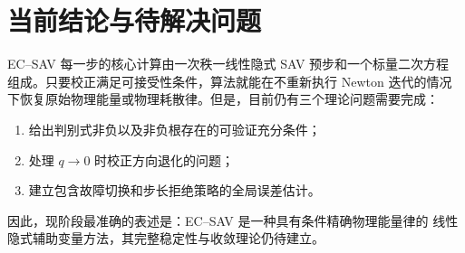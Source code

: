 \documentclass[UTF8,11pt,a4paper]{ctexart}
\theoremstyle{definition}
\theoremstyle{remark}
\begin{document}
\section{当前结论与待解决问题}

EC--SAV 每一步的核心计算由一次秩一线性隐式 SAV 预步和一个标量二次方程
组成。只要校正满足可接受性条件，算法就能在不重新执行 Newton 迭代的情况
下恢复原始物理能量或物理耗散律。但是，目前仍有三个理论问题需要完成：
\begin{enumerate}[label=(\arabic*)]
  \item 给出判别式非负以及非负根存在的可验证充分条件；
  \item 处理 \(q\to0\) 时校正方向退化的问题；
  \item 建立包含故障切换和步长拒绝策略的全局误差估计。
\end{enumerate}
因此，现阶段最准确的表述是：EC--SAV 是一种具有条件精确物理能量律的
线性隐式辅助变量方法，其完整稳定性与收敛理论仍待建立。
\end{document}
